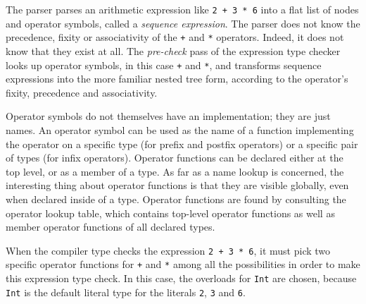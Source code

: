 \documentclass[../generics]{subfiles}
\begin{document}
The parser parses an arithmetic expression like \texttt{2 + 3 * 6} into a flat list of nodes and operator symbols, called a \emph{sequence expression}. The parser does not know the precedence, fixity or associativity of the \texttt{+} and \texttt{*} operators. Indeed, it does not know that they exist at all. The \emph{pre-check} pass of the expression type checker looks up operator symbols, in this case \texttt{+} and \texttt{*}, and transforms sequence expressions into the more familiar nested tree form, according to the operator's fixity, precedence and associativity.

Operator symbols do not themselves have an implementation; they are just names. An operator symbol can be used as the name of a function implementing the operator on a specific type (for prefix and postfix operators) or a specific pair of types (for infix operators). Operator functions can be declared either at the top level, or as a member of a type. As far as a name lookup is concerned, the interesting thing about operator functions is that they are visible globally, even when declared inside of a type. Operator functions are found by consulting the operator lookup table, which contains top-level operator functions as well as member operator functions of all declared types.

When the compiler type checks the expression \texttt{2 + 3 * 6}, it must pick two specific operator functions for \texttt{+} and \texttt{*} among all the possibilities in order to make this expression type check. In this case, the overloads for \texttt{Int} are chosen, because \texttt{Int} is the default literal type for the literals \texttt{2}, \texttt{3} and \texttt{6}.
\end{document}
